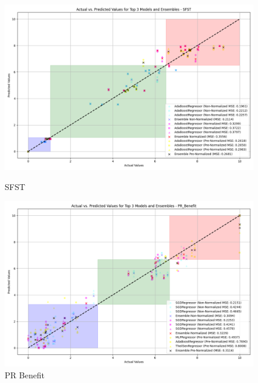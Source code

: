 \begin{figure}[H]
    \centering
    \begin{minipage}{0.45\textwidth}
        \centering
        \includegraphics[width=\linewidth]{reg_section_all/ensemble_learning/actual_vs_predicted_top_3_models_and_ensembles_SFST.png}
        \caption{SFST}
        \label{reg_all_fig:sfst_ensemble}
    \end{minipage}\hfill
    \begin{minipage}{0.45\textwidth}
        \centering
        \includegraphics[width=\linewidth]{reg_section_all/ensemble_learning/actual_vs_predicted_top_3_models_and_ensembles_PR_Benefit.png}
        \caption{PR Benefit}
        \label{reg_all_fig:pr_ben_ensemble}
    \end{minipage}
\end{figure}

